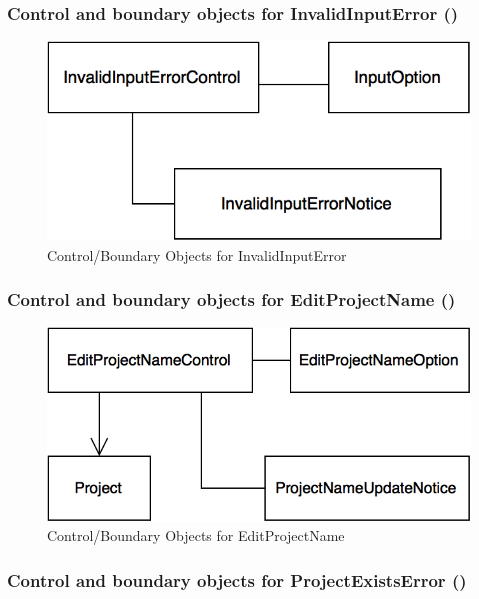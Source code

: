 \documentclass[12pt,letterpaper]{article}
\begin{document}
\subsubsection*{Control and boundary objects for InvalidInputError (\invalidinputerror{})}

\begin{figure}[H]
	\centering{}
	\includegraphics[scale=0.4]{imgs/cbod/invalid-input-error.png}
	\caption{Control/Boundary Objects for InvalidInputError}    
\end{figure}

\subsubsection*{Control and boundary objects for EditProjectName (\editprojectname{})}

\begin{figure}[H]
	\centering{}
	\includegraphics[scale=0.4]{imgs/cbod/edit-project-name.png}
	\caption{Control/Boundary Objects for EditProjectName}    
\end{figure}

\subsubsection*{Control and boundary objects for ProjectExistsError (\projectexistserror{})}
\end{document}
